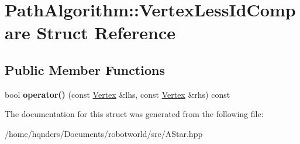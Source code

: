 \hypertarget{struct_path_algorithm_1_1_vertex_less_id_compare}{}\section{Path\+Algorithm\+:\+:Vertex\+Less\+Id\+Compare Struct Reference}
\label{struct_path_algorithm_1_1_vertex_less_id_compare}
\subsection*{Public Member Functions}
\begin{DoxyCompactItemize}
\item 
bool {\bfseries operator()} (const \hyperlink{struct_path_algorithm_1_1_vertex}{Vertex} \&lhs, const \hyperlink{struct_path_algorithm_1_1_vertex}{Vertex} \&rhs) const \hypertarget{struct_path_algorithm_1_1_vertex_less_id_compare_adb205b9c837c7e884ccc2ec32cc69cfc}{}\label{struct_path_algorithm_1_1_vertex_less_id_compare_adb205b9c837c7e884ccc2ec32cc69cfc}

\end{DoxyCompactItemize}


The documentation for this struct was generated from the following file\+:\begin{DoxyCompactItemize}
\item 
/home/hqnders/\+Documents/robotworld/src/A\+Star.\+hpp\end{DoxyCompactItemize}

